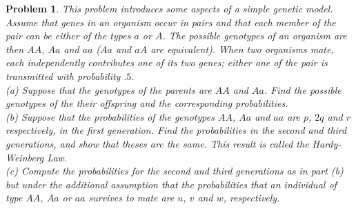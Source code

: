 \documentclass{article}
\newtheorem{problem}{Problem}
\begin{document}
\begin{problem}
This problem introduces some aspects of a simple genetic model. Assume that genes in an organism occur in pairs and that each member of the pair can be either of the types $a$ or $A$. The possible genotypes of an organism are then $AA$, $Aa$ and $aa$ ($Aa$ and $aA$ are equivalent). When two organisms mate, each independently contributes one of its two genes; either one of the pair is transmitted with probability $.5$.\\
(a) Suppose that the genotypes of the parents are $AA$ and $Aa$. Find the possible genotypes of the their offspring and the corresponding probabilities.\\
(b) Suppose that the probabilities of the genotypes $AA$, $Aa$ and $aa$ are $p$, $2q$ and $r$ respectively, in the first generation. Find the probabilities in the second and third generations, and show that theses are the same. This result is called the Hardy-Weinberg Law.\\
(c) Compute the probabilities for the second and third generations as in part (b) but under the additional assumption that the probabilities that an individual of type $AA$, $Aa$ or $aa$ survives to mate are $u$, $v$ and $w$, respectively.
\end{problem}
\end{document}
